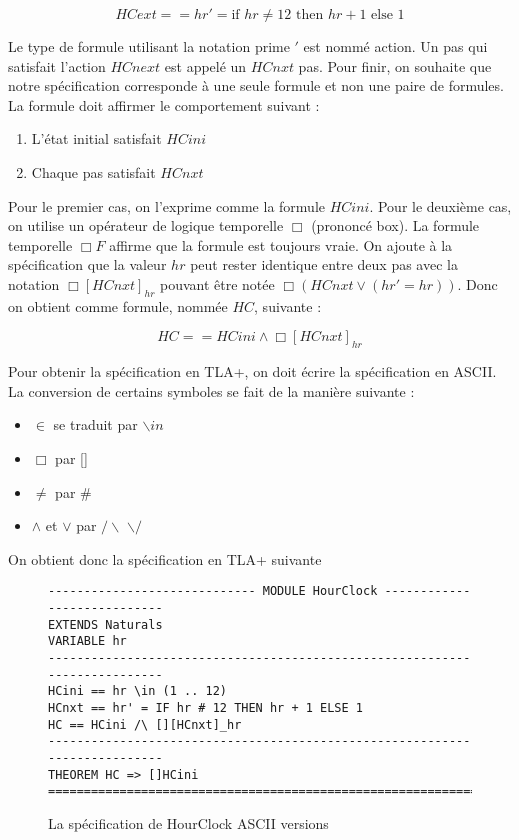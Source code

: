 \documentclass[12pt,a4paper]{article}
\begin{document}
$$ HCext == hr' = \text{if } hr \neq 12 \text{ then } hr + 1 \text{ else } 1 $$

Le type de formule utilisant la notation prime $'$ est nommé action. Un pas qui satisfait l'action $HCnext$ est appelé un $HCnxt$ pas.
Pour finir, on souhaite que notre spécification corresponde à une seule formule et non une paire de formules. La formule doit affirmer le comportement suivant :
\begin{enumerate}
	\item L'état initial satisfait $HCini$
	\item Chaque pas satisfait $HCnxt$
\end{enumerate}
Pour le premier cas, on l'exprime comme la formule $HCini$. Pour le deuxième cas, on utilise un opérateur de logique temporelle $\Box$ (prononcé box). La formule temporelle $\Box F$ affirme que la formule est toujours vraie. On ajoute à la spécification que la valeur $hr$ peut rester identique entre deux pas avec la notation $\Box [HCnxt]_{hr}$ pouvant être notée $\Box (HCnxt \lor (hr' = hr ))$. Donc on obtient comme formule, nommée $HC$, suivante :

$$ HC == HCini  \land  \Box [HCnxt]_{hr} $$

Pour obtenir la spécification en TLA+, on doit écrire la spécification en ASCII. La conversion de certains symboles se fait de la manière suivante :

\begin{itemize}
	\item $\in$ se traduit par $\backslash in$
	\item $\Box$ par []
	\item $\neq$ par \#
	\item $\land$ et $\lor$ par $/ \backslash$ $\backslash /$ 
\end{itemize}

On obtient donc la spécification en TLA+ suivante

\begin{figure}[ht]
\begin{lstlisting}[frame=single, basicstyle=\footnotesize]
----------------------------- MODULE HourClock ----------------------------
EXTENDS Naturals
VARIABLE hr
---------------------------------------------------------------------------
HCini == hr \in (1 .. 12)
HCnxt == hr' = IF hr # 12 THEN hr + 1 ELSE 1
HC == HCini /\ [][HCnxt]_hr
---------------------------------------------------------------------------
THEOREM HC => []HCini
===========================================================================

\end{lstlisting}
\caption{La spécification de HourClock ASCII versions}
\end{figure}
\end{document}
